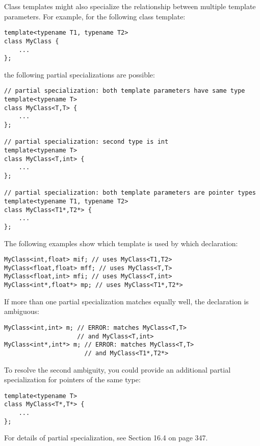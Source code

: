 Class templates might also specialize the relationship between multiple template parameters. For example, for the following class template:

\begin{lstlisting}[style=styleCXX]
template<typename T1, typename T2>
class MyClass {
	...
};
\end{lstlisting}

the following partial specializations are possible:

\begin{lstlisting}[style=styleCXX]
// partial specialization: both template parameters have same type
template<typename T>
class MyClass<T,T> {
	...
};

// partial specialization: second type is int
template<typename T>
class MyClass<T,int> {
	...
};

// partial specialization: both template parameters are pointer types
template<typename T1, typename T2>
class MyClass<T1*,T2*> {
	...
};
\end{lstlisting}

The following examples show which template is used by which declaration:

\begin{lstlisting}[style=styleCXX]
MyClass<int,float> mif; // uses MyClass<T1,T2>
MyClass<float,float> mff; // uses MyClass<T,T>
MyClass<float,int> mfi; // uses MyClass<T,int>
MyClass<int*,float*> mp; // uses MyClass<T1*,T2*>
\end{lstlisting}

If more than one partial specialization matches equally well, the declaration is ambiguous:

\begin{lstlisting}[style=styleCXX]
MyClass<int,int> m; // ERROR: matches MyClass<T,T>
					// and MyClass<T,int>
MyClass<int*,int*> m; // ERROR: matches MyClass<T,T>
					  // and MyClass<T1*,T2*>
\end{lstlisting}

To resolve the second ambiguity, you could provide an additional partial specialization for pointers of the same type:

\begin{lstlisting}[style=styleCXX]
template<typename T>
class MyClass<T*,T*> {
	...
};
\end{lstlisting}

For details of partial specialization, see Section 16.4 on page 347.






